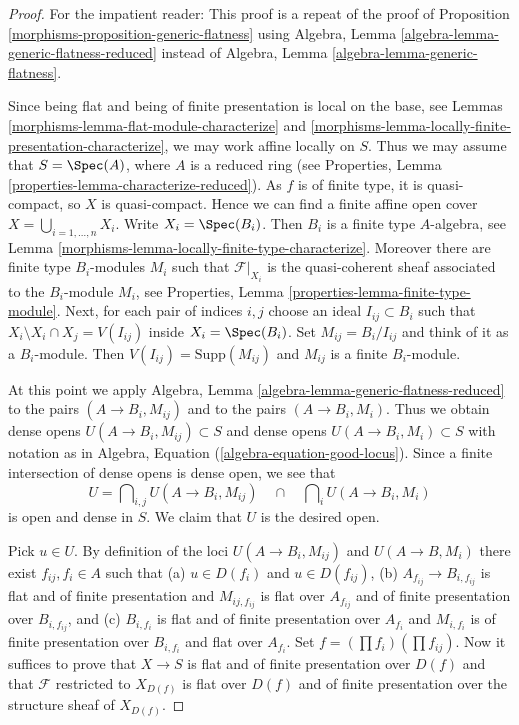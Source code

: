 \begin{proof}

For the impatient reader: This proof is a repeat of the proof of
Proposition \ref{morphisms-proposition-generic-flatness}
using
Algebra, Lemma \ref{algebra-lemma-generic-flatness-reduced}
instead of
Algebra, Lemma \ref{algebra-lemma-generic-flatness}.

\medskip\noindent
Since being flat and being of finite presentation is local on the
base, see
Lemmas \ref{morphisms-lemma-flat-module-characterize} and
\ref{morphisms-lemma-locally-finite-presentation-characterize},
we may work affine locally on $S$. Thus we may assume that
$S = \Spec(A)$, where $A$ is a reduced ring (see
Properties, Lemma \ref{properties-lemma-characterize-reduced}).
As $f$ is of finite type, it is quasi-compact, so $X$ is quasi-compact.
Hence we can find a finite affine open cover
$X = \bigcup_{i = 1, \ldots, n} X_i$. Write $X_i = \Spec(B_i)$.
Then $B_i$ is a finite type $A$-algebra, see
Lemma \ref{morphisms-lemma-locally-finite-type-characterize}.
Moreover there are finite type
$B_i$-modules $M_i$ such that $\mathcal{F}|_{X_i}$ is the
quasi-coherent sheaf associated to the $B_i$-module $M_i$, see
Properties, Lemma \ref{properties-lemma-finite-type-module}.
Next, for each pair of indices $i, j$ choose an ideal $I_{ij} \subset B_i$
such that $X_i \setminus X_i \cap X_j = V(I_{ij})$ inside
$X_i = \Spec(B_i)$. Set $M_{ij} = B_i/I_{ij}$ and think
of it as a $B_i$-module. Then $V(I_{ij}) = \text{Supp}(M_{ij})$
and $M_{ij}$ is a finite $B_i$-module.

\medskip\noindent
At this point we apply
Algebra, Lemma \ref{algebra-lemma-generic-flatness-reduced} to
the pairs $(A \to B_i, M_{ij})$ and to the pairs $(A \to B_i, M_i)$.
Thus we obtain dense opens
$U(A \to B_i, M_{ij}) \subset S$ and dense opens
$U(A \to B_i, M_i) \subset S$ with notation as in
Algebra, Equation (\ref{algebra-equation-good-locus}).
Since a finite intersection of dense opens is dense open, we see that
$$
U =
\bigcap\nolimits_{i, j} U(A \to B_i, M_{ij})
\quad\cap\quad
\bigcap\nolimits_i U(A \to B_i, M_i)
$$
is open and dense in $S$. We claim that $U$ is the desired open.

\medskip\noindent
Pick $u \in U$. By definition of the loci $U(A \to B_i, M_{ij})$
and $U(A \to B, M_i)$ there exist $f_{ij}, f_i \in A$ such that
(a) $u \in D(f_i)$ and $u \in D(f_{ij})$,
(b) $A_{f_{ij}} \to B_{i, f_{ij}}$ is flat and of finite presentation
and $M_{ij, f_{ij}}$ is flat over $A_{f_{ij}}$ and of finite presentation
over $B_{i, f_{ij}}$, and
(c) $B_{i, f_i}$ is flat and of finite presentation over $A_{f_i}$ and
$M_{i, f_i}$ is of finite presentation over $B_{i, f_i}$ and flat over
$A_{f_i}$. Set
$f = (\prod f_i) (\prod f_{ij})$.
Now it suffices to prove that $X \to S$ is flat and of finite presentation
over $D(f)$ and that $\mathcal{F}$ restricted to $X_{D(f)}$ is
flat over $D(f)$ and of finite presentation over the structure sheaf
of $X_{D(f)}$.


\end{proof}
